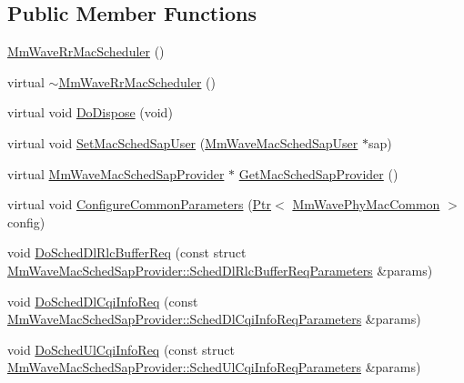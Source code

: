 \subsection*{Public Member Functions}
\begin{DoxyCompactItemize}
\item 
\hyperlink{classns3_1_1MmWaveRrMacScheduler_a383fa5909bb225783e5cb4ec0ef2f199}{Mm\+Wave\+Rr\+Mac\+Scheduler} ()
\item 
virtual \hyperlink{classns3_1_1MmWaveRrMacScheduler_a81765bb17010d15e780b39cb8dfaa728}{$\sim$\+Mm\+Wave\+Rr\+Mac\+Scheduler} ()
\item 
virtual void \hyperlink{classns3_1_1MmWaveRrMacScheduler_a3e4831ffdd2b9253f7f0bd334b66e0e3}{Do\+Dispose} (void)
\item 
virtual void \hyperlink{classns3_1_1MmWaveRrMacScheduler_a455ebd26767f800f77dc1c8005cd7d3c}{Set\+Mac\+Sched\+Sap\+User} (\hyperlink{classns3_1_1MmWaveMacSchedSapUser}{Mm\+Wave\+Mac\+Sched\+Sap\+User} $\ast$sap)
\item 
virtual \hyperlink{classns3_1_1MmWaveMacSchedSapProvider}{Mm\+Wave\+Mac\+Sched\+Sap\+Provider} $\ast$ \hyperlink{classns3_1_1MmWaveRrMacScheduler_a17add5325a0d6d1a249aa6fac8ec3cbc}{Get\+Mac\+Sched\+Sap\+Provider} ()
\item 
virtual void \hyperlink{classns3_1_1MmWaveRrMacScheduler_a848387e2d4605be3abb399cc10016b76}{Configure\+Common\+Parameters} (\hyperlink{classns3_1_1Ptr}{Ptr}$<$ \hyperlink{classns3_1_1MmWavePhyMacCommon}{Mm\+Wave\+Phy\+Mac\+Common} $>$ config)
\item 
void \hyperlink{classns3_1_1MmWaveRrMacScheduler_af3929899f775a5da4c2103ea20dc31a4}{Do\+Sched\+Dl\+Rlc\+Buffer\+Req} (const struct \hyperlink{structns3_1_1MmWaveMacSchedSapProvider_1_1SchedDlRlcBufferReqParameters}{Mm\+Wave\+Mac\+Sched\+Sap\+Provider\+::\+Sched\+Dl\+Rlc\+Buffer\+Req\+Parameters} \&params)
\item 
void \hyperlink{classns3_1_1MmWaveRrMacScheduler_a02891734f11dd8fd2feb98fdd2bcac94}{Do\+Sched\+Dl\+Cqi\+Info\+Req} (const \hyperlink{structns3_1_1MmWaveMacSchedSapProvider_1_1SchedDlCqiInfoReqParameters}{Mm\+Wave\+Mac\+Sched\+Sap\+Provider\+::\+Sched\+Dl\+Cqi\+Info\+Req\+Parameters} \&params)
\item 
void \hyperlink{classns3_1_1MmWaveRrMacScheduler_a7914f7ed4851eabd5b88838da3399971}{Do\+Sched\+Ul\+Cqi\+Info\+Req} (const struct \hyperlink{structns3_1_1MmWaveMacSchedSapProvider_1_1SchedUlCqiInfoReqParameters}{Mm\+Wave\+Mac\+Sched\+Sap\+Provider\+::\+Sched\+Ul\+Cqi\+Info\+Req\+Parameters} \&params)

\end{DoxyCompactItemize}
